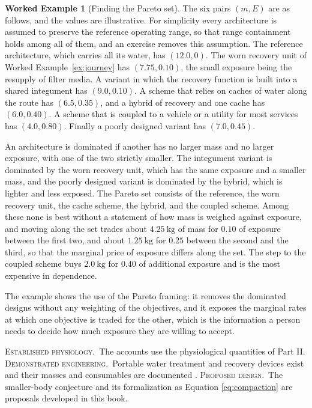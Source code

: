 \documentclass[11pt,openany]{book}
\theoremstyle{definition}
\newtheorem{example}{Worked Example}[chapter]
\theoremstyle{remark}
\newcommand{\est}{\textsc{Established physiology.}\ }
\newcommand{\dem}{\textsc{Demonstrated engineering.}\ }
\newcommand{\pro}{\textsc{Proposed design.}\ }
\begin{document}
\begin{example}[Finding the Pareto set]
\label{ex:pareto}
The six pairs $(m,E)$ are as follows, and the values are illustrative. For simplicity every architecture is assumed to preserve the reference operating range, so that range containment holds among all of them, and an exercise removes this assumption. The reference architecture, which carries all its water, has $(12.0,0)$. The worn recovery unit of Worked Example~\ref{ex:journey} has $(7.75,0.10)$, the small exposure being the resupply of filter media. A variant in which the recovery function is built into a shared integument has $(9.0,0.10)$. A scheme that relies on caches of water along the route has $(6.5,0.35)$, and a hybrid of recovery and one cache has $(6.0,0.40)$. A scheme that is coupled to a vehicle or a utility for most services has $(4.0,0.80)$. Finally a poorly designed variant has $(7.0,0.45)$.

An architecture is dominated if another has no larger mass and no larger exposure, with one of the two strictly smaller. The integument variant is dominated by the worn recovery unit, which has the same exposure and a smaller mass, and the poorly designed variant is dominated by the hybrid, which is lighter and less exposed. The Pareto set consists of the reference, the worn recovery unit, the cache scheme, the hybrid, and the coupled scheme. Among these none is best without a statement of how mass is weighed against exposure, and moving along the set trades about $4.25\ \mathrm{kg}$ of mass for $0.10$ of exposure between the first two, and about $1.25\ \mathrm{kg}$ for $0.25$ between the second and the third, so that the marginal price of exposure differs along the set. The step to the coupled scheme buys $2.0\ \mathrm{kg}$ for $0.40$ of additional exposure and is the most expensive in dependence.
\end{example}

The example shows the use of the Pareto framing: it removes the dominated designs without any weighting of the objectives, and it exposes the marginal rates at which one objective is traded for the other, which is the information a person needs to decide how much exposure they are willing to accept.

\begin{evidence}
\est The accounts use the physiological quantities of Part II. \dem Portable water treatment and recovery devices exist and their masses and consumables are documented \cite{eckart1996}. \pro The smaller-body conjecture and its formalization as Equation \eqref{eq:compaction} are proposals developed in this book.
\end{evidence}
\end{document}
